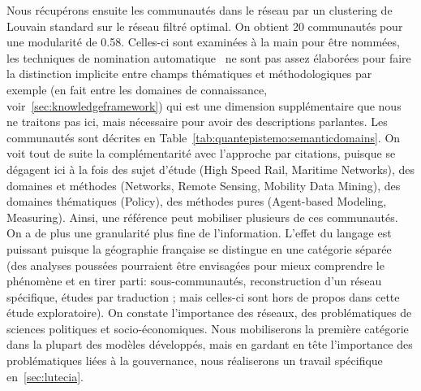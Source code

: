 {Nous récupérons ensuite les communautés dans le réseau par un clustering de Louvain standard sur le réseau filtré optimal. On obtient 20 communautés pour une modularité de 0.58. Celles-ci sont examinées à la main pour être nommées, les techniques de nomination automatique~\cite{yang2000improving} ne sont pas assez élaborées pour faire la distinction implicite entre champs thématiques et méthodologiques par exemple (en fait entre les domaines de connaissance, voir~\ref{sec:knowledgeframework}) qui est une dimension supplémentaire que nous ne traitons pas ici, mais nécessaire pour avoir des descriptions parlantes. Les communautés sont décrites en Table~\ref{tab:quantepistemo:semanticdomains}. On voit tout de suite la complémentarité avec l'approche par citations, puisque se dégagent ici à la fois des sujet d'étude (High Speed Rail, Maritime Networks), des domaines et méthodes (Networks, Remote Sensing, Mobility Data Mining), des domaines thématiques (Policy), des méthodes pures (Agent-based Modeling, Measuring). Ainsi, une référence peut mobiliser plusieurs de ces communautés. On a de plus une granularité plus fine de l'information. L'effet du langage est puissant puisque la géographie française se distingue en une catégorie séparée (des analyses poussées pourraient être envisagées pour mieux comprendre le phénomène et en tirer parti: sous-communautés, reconstruction d'un réseau spécifique, études par traduction ; mais celles-ci sont hors de propos dans cette étude exploratoire). On constate l'importance des réseaux, des problématiques de sciences politiques et socio-économiques. Nous mobiliserons la première catégorie dans la plupart des modèles développés, mais en gardant en tête l'importance des problématiques liées à la gouvernance, nous réaliserons un travail spécifique en~\ref{sec:lutecia}.
}





